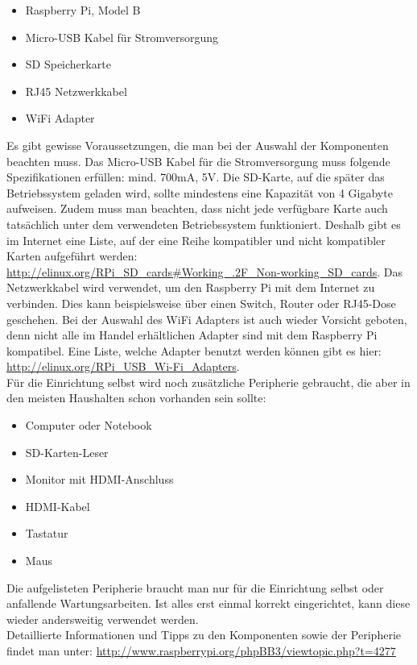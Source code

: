 \begin{itemize}
  \item Raspberry Pi, Model B
  \item Micro-USB Kabel für Stromversorgung
  \item SD Speicherkarte
  \item RJ45 Netzwerkkabel
  \item WiFi Adapter
\end{itemize}

Es gibt gewisse Voraussetzungen, die man bei der Auswahl der Komponenten beachten muss. Das Micro-USB Kabel für die Stromversorgung muss folgende Spezifikationen erfüllen: mind. 700mA, 5V. Die SD-Karte, auf die später das Betriebssystem geladen wird, sollte mindestens eine Kapazität von 4 Gigabyte aufweisen. Zudem muss man beachten, dass nicht jede verfügbare Karte auch tatsächlich unter dem verwendeten Betriebssystem funktioniert. Deshalb gibt es im Internet eine Liste, auf der eine Reihe kompatibler und nicht kompatibler Karten aufgeführt werden: \url{http://elinux.org/RPi\_SD\_cards\#Working\_.2F\_Non-working\_SD\_cards}.
Das Netzwerkkabel wird verwendet, um den Raspberry Pi mit dem Internet zu verbinden. Dies kann beispielsweise über einen Switch, Router oder RJ45-Dose geschehen.
Bei der Auswahl des WiFi Adapters ist auch wieder Vorsicht geboten, denn nicht alle im Handel erhältlichen Adapter sind mit dem Raspberry Pi kompatibel. Eine Liste, welche Adapter benutzt werden können gibt es hier: \url{http://elinux.org/RPi_USB_Wi-Fi_Adapters}.
\\
Für die Einrichtung selbst wird noch zusätzliche Peripherie gebraucht, die aber in den meisten Haushalten schon vorhanden sein sollte:

\begin{itemize}
  \item Computer oder Notebook
  \item SD-Karten-Leser
  \item Monitor mit HDMI-Anschluss
  \item HDMI-Kabel
  \item Tastatur
  \item Maus
\end{itemize}

Die aufgelisteten Peripherie braucht man nur für die Einrichtung selbst oder anfallende Wartungsarbeiten.
Ist alles erst einmal korrekt eingerichtet, kann diese wieder andersweitig verwendet werden.
\\
Detaillierte Informationen und Tipps zu den Komponenten sowie der Peripherie findet man unter: \url{http://www.raspberrypi.org/phpBB3/viewtopic.php?t=4277}

